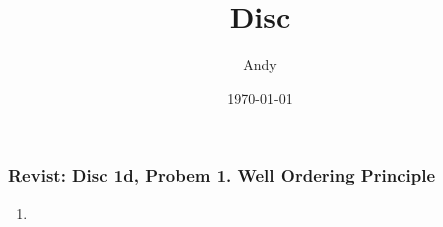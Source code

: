 \documentclass{beamer}
\title{Disc}
\author{Andy}
\institute{UC Berkeley}
\date{\today}
\begin{document}
\begin{frame}
    \titlepage
\end{frame}

\begin{frame}
    \frametitle{Revist: Disc 1d, Probem 1. Well Ordering Principle}

    \begin{enumerate}[<+->]
        \item 
    \end{enumerate}

\end{frame}
\end{document}
